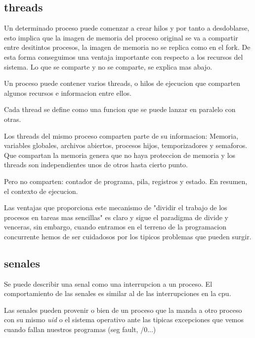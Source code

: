 \documentclass[12pt, letterpaper]{article}
\begin{document}
\subsection{threads}

Un determinado proceso puede comenzar a crear hilos y por tanto a desdoblarse, esto implica que la imagen de memoria del proceso original se va a compartir entre desitintos procesos, la imagen de memoria no se replica como en el fork. De esta forma conseguimos una ventaja importante con respecto a los recursos del sistema. Lo que se comparte y no se comparte, se explica mas abajo.\par

Un proceso puede contener varios threads, o hilos de ejecucion que comparten algunos recursos e informacion entre ellos.\par

Cada thread se define como una funcion que se puede lanzar en paralelo con otras.\par

Los threads del mismo proceso comparten parte de su informacion: Memoria, variables globales, archivos abiertos, procesos hijos, temporizadores y semaforos. Que compartan la memoria genera que no haya proteccion de memoria y los threads son independientes unos de otros hasta cierto punto.\par
Pero no comparten: contador de programa, pila, registros y estado. En resumen, el contexto de ejecucion.\par

Las ventajas que proporciona este mecanismo de "dividir el trabajo de los procesos en tareas mas sencillas" es claro y sigue el paradigma de divide y venceras, sin embargo, cuando entramos en el terreno de la programacion concurrente hemos de ser cuidadosos por los tipicos problemas que pueden surgir.\par

\subsection{senales}

Se puede describir una senal como una interrupcion a un proceso. El comportamiento de las senales es similar al de las interrupciones en la cpu.\par

Las senales pueden provenir o bien de un proceso que la manda a otro proceso con su mismo \textit{uid} o el sistema operativo ante las tipicas excepciones que vemos cuando fallan nuestros programas (seg fault, /0...)\par
\end{document}
